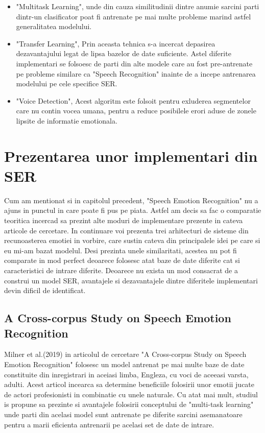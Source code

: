 \documentclass[a4paper,12pt]{book}
\begin{document}
						\begin{itemize}
							\setlength\topsep{0pt}
							\setlength\itemsep{0pt}
							\setlength{\itemindent}{1cm}
							\item  "Multitask Learning", unde din cauza similitudinii dintre anumie sarcini parti dintr-un clasificator poat fi antrenate pe mai multe probleme marind astfel generalitatea modelului.
							\item "Transfer Learning", Prin aceasta tehnica s-a incercat depasirea dezavantajului legat de lipsa bazelor de date suficiente. Astel diferite implementari se folsoesc de parti din alte modele care au fost pre-antrenate pe probleme similare ca "Speech Recognition" inainte de a incepe antrenarea modelului pe cele specifice SER.
							\item "Voice Detection", Acest algoritm este folsoit pentru exluderea segmentelor care nu contin vocea umana, pentru a reduce posibilele erori aduse de zonele lipsite de informatie emotionala. 						
					\end{itemize}
				
				
				\section{Prezentarea unor implementari din SER} \label{papers}
					Cum am mentionat si in capitolul precedent, "Speech Emotion Recognition" nu a ajuns in punctul in care poate fi pus pe piata. Astfel am decis sa fac o comparatie teoritica incercad sa prezint alte moduri de implementare prezente in cateva articole de cercetare. In continuare voi prezenta trei arhitecturi de sisteme din recunoasterea emotiei in vorbire, care sustin cateva din principalele idei pe care si eu mi-am bazat modelul. Desi prezinta unele similaritati, acestea nu pot fi comparate in mod perfect deoarece folosesc atat baze de date diferite cat si caracteristici de intrare diferite. Deoarece nu exista un mod consacrat de a construi un model SER, avantajele si dezavantajele dintre diferitele implementari devin dificil de identificat. \par		
					
					\subsection{A Cross-corpus Study on Speech Emotion Recognition} \label{prez_multi_domain}
					
					
					Milner et al.(2019) in articolul de cercetare "A Cross-corpus Study on Speech Emotion Recognition" \cite{multi-domain} folosesc un model antrenat pe mai multe baze de date constituite din inregistrari in aceiasi limba, Engleza, cu voci de aceeasi varsta, adulti. Acest articol incearca sa determine beneficiile folosirii  unor emotii jucate de actori profesionisti in combinatie cu unele naturale. Cu atat mai mult, studiul is propune sa prezinte si avantajele folosirii conceptului de "multi-task learning" unde parti din acelasi model sunt antrenate pe diferite sarcini asemanatoare pentru a marii eficienta antrenarii pe acelasi set de date de intrare. \par
					
\end{document}
